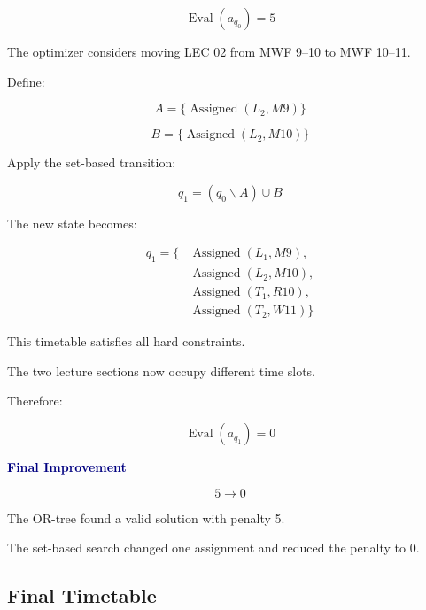 \documentclass[11pt,letterpaper]{article}
\newcommand{\setminusop}{\mathbin{\backslash}}
\newcommand{\Assign}{\operatorname{Assigned}}
\newcommand{\Eval}{\operatorname{Eval}}
\newcommand{\key}[1]{
    \textcolor{navy}{\bfseries #1}
}
\begin{document}
\begin{equation}
\boxed{
\Eval(a_{q_0})=5
}
\end{equation}

The optimizer considers moving LEC 02
from MWF 9--10 to MWF 10--11.

Define:

\begin{equation}
A=\{\Assign(L_2,M9)\}
\end{equation}

\begin{equation}
B=\{\Assign(L_2,M10)\}
\end{equation}

Apply the set-based transition:

\begin{equation}
\boxed{
q_1=(q_0\setminusop A)\cup B
}
\end{equation}

The new state becomes:

\begin{equation}
\begin{aligned}
q_1=\{&
\Assign(L_1,M9),\\
&
\Assign(L_2,M10),\\
&
\Assign(T_1,R10),\\
&
\Assign(T_2,W11)
\}
\end{aligned}
\end{equation}

This timetable satisfies all hard constraints.

The two lecture sections now occupy
different time slots.

Therefore:

\begin{equation}
\boxed{
\Eval(a_{q_1})=0
}
\end{equation}

\begin{goodbox}
\key{Final Improvement}

\[
\boxed{
5\longrightarrow0
}
\]

The OR-tree found a valid solution
with penalty 5.

The set-based search changed one
assignment and reduced the penalty to 0.
\end{goodbox}

\subsection{Final Timetable}
\end{document}
